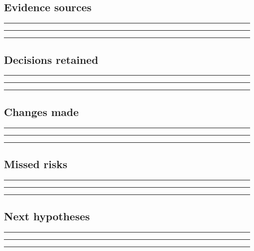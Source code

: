 \documentclass[11pt]{article}
\begin{document}
\subsection{Evidence sources}
\noindent\rule{\linewidth}{0.3pt}\par\vspace{0.18in}
\noindent\rule{\linewidth}{0.3pt}\par\vspace{0.18in}
\noindent\rule{\linewidth}{0.3pt}\par\vspace{0.14in}

\subsection{Decisions retained}
\noindent\rule{\linewidth}{0.3pt}\par\vspace{0.18in}
\noindent\rule{\linewidth}{0.3pt}\par\vspace{0.18in}
\noindent\rule{\linewidth}{0.3pt}\par\vspace{0.14in}

\subsection{Changes made}
\noindent\rule{\linewidth}{0.3pt}\par\vspace{0.18in}
\noindent\rule{\linewidth}{0.3pt}\par\vspace{0.18in}
\noindent\rule{\linewidth}{0.3pt}\par\vspace{0.14in}

\subsection{Missed risks}
\noindent\rule{\linewidth}{0.3pt}\par\vspace{0.18in}
\noindent\rule{\linewidth}{0.3pt}\par\vspace{0.18in}
\noindent\rule{\linewidth}{0.3pt}\par\vspace{0.14in}

\subsection{Next hypotheses}
\noindent\rule{\linewidth}{0.3pt}\par\vspace{0.18in}
\noindent\rule{\linewidth}{0.3pt}\par\vspace{0.18in}
\noindent\rule{\linewidth}{0.3pt}\par\vspace{0.14in}
\end{document}
